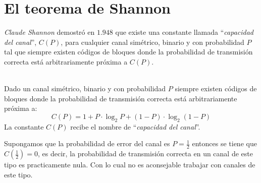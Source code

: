 %
%

%
\newpage
%
\section{El teorema de Shannon}

\emph{Claude Shannon} demostr\'o en $1.948$ que existe una constante llamada
``\emph{capacidad del canal}'', $C(P)$, para cualquier canal sim\'etrico,
binario y con probabilidad $P$ tal que siempre existen c\'odigos de bloques
donde la probabilidad de transmisi\'on correcta est\'a arbitrariamente
pr\'oxima a $C(P)$.
\begin{teorema}[de Shannon, $1.948$]
\ \\
Dado un canal sim\'etrico, binario y con probabilidad $P$ siempre existen
c\'odigos de bloques donde la probabilidad de transmisi\'on correcta est\'a
arbitrariamente pr\'oxima a:
\begin{displaymath}
C(P) = 1 + P \cdot \log_2 P+(1-P)\cdot \log_2 (1-P)
\end{displaymath}
La constante $C(P)$ recibe el nombre de ``\emph{capacidad del canal}''.
\end{teorema}

Supongamos que la probabilidad de error del canal es $P=\frac{1}{2}$ entonces
se tiene que $C(\frac{1}{2})=0$, es decir, la probabilidad de transmisi\'on 
correcta en un canal de este tipo es practicamente nula. Con lo cual no es 
aconsejable trabajar con canales de este tipo.
